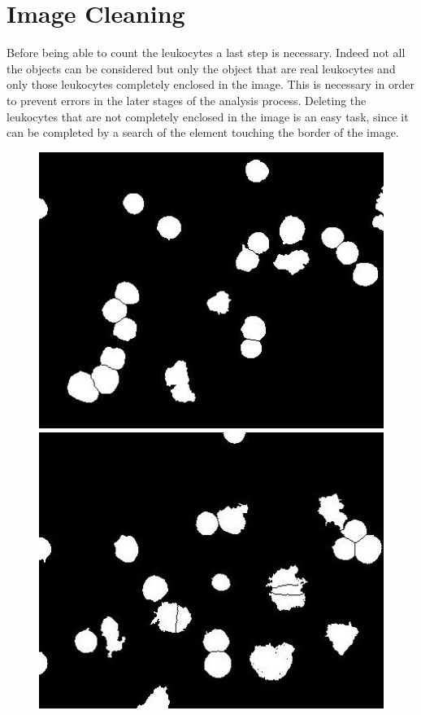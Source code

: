 {	\section{Image Cleaning}
	Before being able to count the leukocytes a last step is necessary. Indeed not all the objects can be considered but only the object that are real leukocytes and only those leukocytes completely enclosed in the image. This is necessary in order to prevent errors in the later stages of the analysis process. Deleting the leukocytes that are not completely enclosed in the image is an easy task, since it can be completed by a search of the element touching the border of the image. 
	
	\begin{figure}[!htbp]
		\centering
		\includegraphics[height=0.23\textheight]{images/Fig13-1}\vspace{1mm}
		\includegraphics[height=0.23\textheight]{images/Fig13-2}

\end{figure}}
